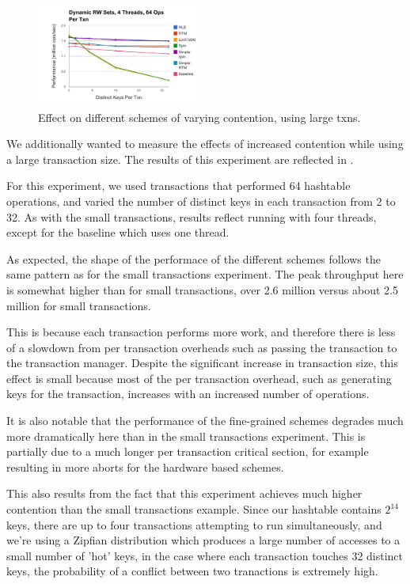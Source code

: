 \begin{figure}[h!]
  \centering
  \includegraphics[width=0.48\textwidth]{figure/large_txns.pdf}
  \caption{Effect on different schemes of varying contention, using large txns.}
  \label{fig:large_txns} 
\end{figure}

We additionally wanted to measure the effects of increased contention while 
using a large transaction size. The results of this experiment are reflected 
in .

For this experiment, we used transactions that performed 64 hashtable operations, 
and varied the number of distinct keys in each transaction from 2 to 32. As with 
the small transactions, results reflect running with four threads, except for 
the baseline which uses one thread.

As expected, the shape of the performace of the different schemes follows the 
same pattern as for the small transactions experiment. The peak throughput here 
is somewhat higher than for small transactions, over 2.6 million versus about 
2.5 million for small transactions.

This is because each transaction performs more work, and therefore there is less 
of a slowdown from per transaction overheads such as passing the transaction to 
the transaction manager. Despite the significant increase in transaction size, 
this effect is small because most of the per transaction overhead, such as 
generating keys for the transaction, increases with an increased number of 
operations.

It is also notable that the performance of the fine-grained schemes degrades 
much more dramatically here than in the small transactions experiment. This is 
partially due to a much longer per transaction critical section, for example resulting in 
more aborts for the hardware based schemes.

This also results from the fact that this experiment achieves much higher 
contention than the small transactions example. Since our hashtable contains $2^{14}$ 
keys, there are up to four transactions attempting to run simultaneously, and we're using 
a Zipfian distribution which produces a large number of accesses to a small number of 'hot' 
keys, in the case where each transaction touches 32 distinct keys, the probability of a 
conflict between two tranactions is extremely high.


